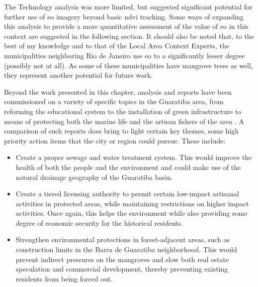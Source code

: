 The Technology analysis was more limited, but suggested significant potential for further use of \ac{eo} imagery beyond basic \ac{ndvi} tracking. Some ways of expanding this analysis to provide a more quantitative assessment of the value of \ac{eo} in this context are suggested in the following section. It should also be noted that, to the best of my knowledge and to that of the Local Area Context Experts, the municipalities neighboring Rio de Janeiro use \ac{eo} to a significantly lesser degree (possibly not at all). As some of these municipalities have mangrove trees as well, they represent another potential for future work.


Beyond the work presented in this chapter, analysis and reports have been commissioned on a variety of specific topics in the Guaratiba area, from reforming the educational system \cite{pizzolatoLOCALIZACAOESCOLASPUBLICAS2013} to the installation of green infrastructure \cite{herzogGuaratibaVerdeSubsidios2009} to means of protecting both the marine life and the artisan fishers of the area \cite{lopesTerritorialidadesEmConflitos2013}. A comparison of such reports does bring to light certain key themes, some high priority action items that the city or region could pursue. These include:

\begin{itemize}[itemsep=0pt,parsep=0pt]
	\item{Create a proper sewage and water treatment system. This would improve the health of both the people and the environment and could make use of the natural drainage geography of the Guaratiba basin.}
	\item{Create a tiered licensing authority to permit certain low-impact artisanal activities in protected areas, while maintaining restrictions on higher impact activities. Once again, this helps the environment while also providing some degree of economic security for the historical residents.}
	\item{Strengthen environmental protections in forest-adjacent areas, such as construction limits in the Barra de Guaratiba neighborhood. This would prevent indirect pressures on the mangroves and slow both real estate speculation and commercial development, thereby preventing existing residents from being forced out.}
\end{itemize}

